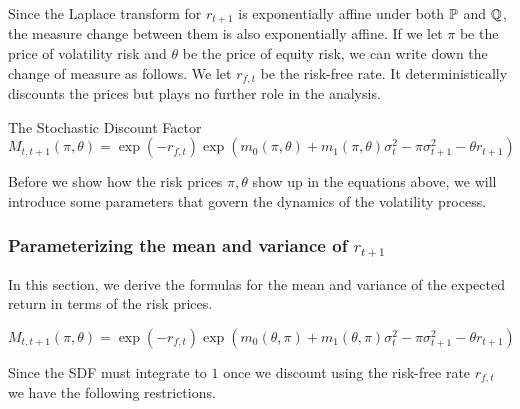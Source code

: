\documentclass[11pt, letterpaper, twoside, final]{article}
\begin{document}
Since the Laplace transform for $r_{t+1}$  is exponentially affine under both $\mathbb{P}$ and $\mathbb{Q}$, the measure change
between them is also exponentially affine.
If we let $\pi$ be the price of volatility risk and $\theta$ be the price of equity risk, we can write down the
change of measure as follows.
We let $r_{f,t}$ be the risk-free rate.
It deterministically discounts the prices but plays no further role in the analysis.


\begin{defn}{The Stochastic Discount Factor}
    \begin{equation}
        M_{t,t+1}(\pi, \theta) = \exp\left(-r_{f,t}\right) \exp\left(m_{0}(\pi, \theta) + m_1(\pi, \theta)
        \sigma_t^2 - \pi \sigma^2_{t+1} - \theta r_{t+1}\right) 
    \end{equation}
\end{defn}


Before we show how the risk prices $\pi, \theta$ show up in the equations above, we will introduce some parameters
that govern the dynamics of the volatility process.



\subsubsection{\texorpdfstring{Parameterizing the mean and variance of $r_{t+1}$}{Parameterizing the return's
mean and variance}}\label{sec:deriving_sdf_functions}


In this section, we derive the formulas for the mean and variance of the expected return in terms of the risk
prices.

\begin{equation}
    M_{t,t+1}(\pi, \theta) = \exp(-r_{f,t}) \exp \left( m_0(\theta, \pi) + m_1(\theta, \pi) \sigma_t^2 - \pi
    \sigma^2_{t+1} - \theta r_{t+1}\right)
\end{equation}

Since the SDF must integrate to $1$ once we discount using the risk-free rate $r_{f,t}$\, we have the following
restrictions.
\end{document}

